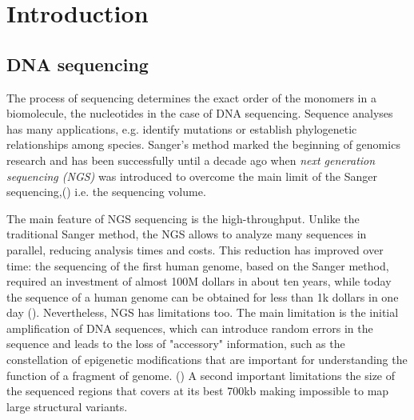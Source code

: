 
\chapter{Introduction} %

\label{Chapter2} %






\section{DNA sequencing}




The process of sequencing determines the exact order of the monomers in a biomolecule, the nucleotides in the case of DNA sequencing. Sequence analyses has many applications, e.g. identify mutations or establish phylogenetic relationships among species. Sanger's method marked the beginning of genomics research and has been successfully until a decade ago when \textit{next generation sequencing (NGS)} was introduced to overcome the main limit of the Sanger sequencing,(\cite{Sanger5463}) i.e. the sequencing volume.

The main feature of NGS sequencing is the high-throughput. Unlike the traditional Sanger method, the NGS allows to analyze many sequences in parallel, reducing analysis times and costs. This reduction has improved over time: the sequencing of the first human genome, based on the Sanger method, required an investment of almost 100M dollars in about ten years, while today the sequence of a human genome can be obtained for less than 1k dollars in one day (\cite{sequencing}). Nevertheless, NGS has limitations too. The main limitation is the initial amplification of DNA sequences, which can introduce random errors in the sequence and leads to the loss of "accessory" information, such as the constellation of epigenetic modifications that are important for understanding the function of a fragment of genome. (\cite{sequencing}) A second important limitations the size of the sequenced regions that covers at its best 700kb making impossible to map large structural variants.

